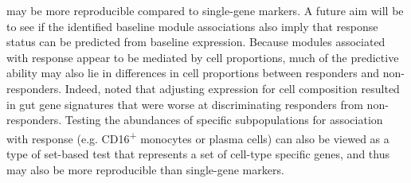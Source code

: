 may be more reproducible compared to single-gene markers. 
%
A future aim will be to see if the identified baseline module associations also imply that response status can be predicted from baseline expression.
Because modules associated with response appear to be mediated by cell proportions,
much of the predictive ability may also lie in differences in cell proportions between responders and non-responders.
Indeed, \textcite{gaujoux2019CellcentredMetaanalysisReveals} noted that adjusting expression for cell composition resulted in gut gene signatures that were worse at discriminating responders from non-responders.
Testing the abundances of specific subpopulations for association with response (e.g. CD16\textsuperscript{+} monocytes or plasma cells) 
can also be viewed as a type of set-based test that represents a set of cell-type specific genes,
and thus may also be more reproducible than single-gene markers.

